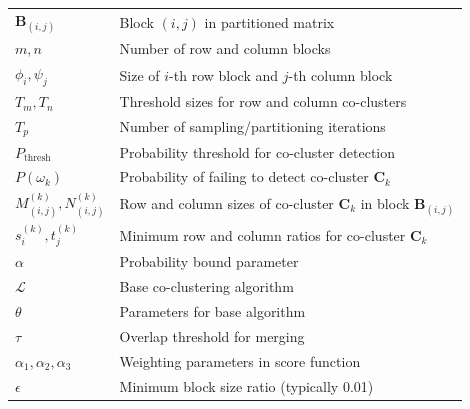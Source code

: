 \documentclass[journal]{IEEEtran}
\begin{document}
{\begin{table}[htbp]
\begin{tabular}{@{} p{} p{} @{}}
                $\mathbf{B}_{(i,j)}$               & Block $(i,j)$ in partitioned matrix                                             \\
                $m, n$                             & Number of row and column blocks                                                 \\
                $\phi_i, \psi_j$                   & Size of $i$-th row block and $j$-th column block                                \\
                $T_m, T_n$                         & Threshold sizes for row and column co-clusters                                  \\
                $T_p$                              & Number of sampling/partitioning iterations                                      \\
                $P_{\text{thresh}}$                & Probability threshold for co-cluster detection                                  \\
                $P(\omega_k)$                      & Probability of failing to detect co-cluster $\mathbf{C}_k$                      \\
                $M_{(i,j)}^{(k)}, N_{(i,j)}^{(k)}$ & Row and column sizes of co-cluster $\mathbf{C}_k$ in block $\mathbf{B}_{(i,j)}$ \\
                $s_i^{(k)}, t_j^{(k)}$             & Minimum row and column ratios for co-cluster $\mathbf{C}_k$                     \\
                $\alpha$                           & Probability bound parameter                                                     \\
                $\mathcal{L}$                      & Base co-clustering algorithm                                                    \\
                $\theta$                           & Parameters for base algorithm                                                   \\
                $\tau$                             & Overlap threshold for merging                                                   \\
                $\alpha_1, \alpha_2, \alpha_3$     & Weighting parameters in score function                                          \\
                $\epsilon$                         & Minimum block size ratio (typically 0.01)                                       \\

\end{tabular}
\end{table}}
\end{document}
